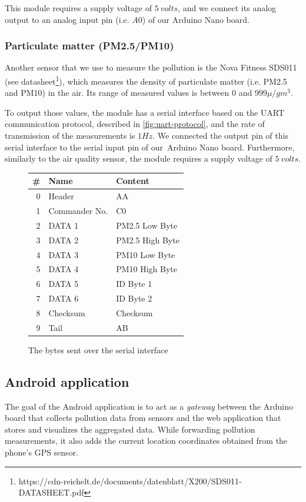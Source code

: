 \documentclass[12pt]{article}
\begin{document}
  This module requires a supply voltage of $5\ volts$, and we connect its analog output to an analog input pin (i.e. $A0$) of our Arduino Nano board.

  \subsubsection{Particulate matter (PM2.5/PM10)}
  Another sensor that we use to measure the pollution is the Nova Fitness SDS011 (see datasheet\footnote{https://cdn-reichelt.de/documents/datenblatt/X200/SDS011-DATASHEET.pdf}), which measures the density of particulate matter (i.e. PM2.5 and PM10) in the air. Its range of measured values is between $0$ and $999\mu/gm^3$.

  To output those values, the module has a serial interface based on the UART communication protocol, described in \autoref{fig:uart-protocol}, and the rate of transmission of the measurements is $1Hz$. We connected the output pin of this serial interface to the serial input pin of our Arduino Nano board. Furthermore, similarly to the air quality sensor, the module requires a supply voltage of $5\ volts$.


  \begin{figure}[ht]
    \centering
    \begin{tabular}{r | l | l}
      \# & Name & Content\\\toprule
      0 & Header & AA\\
      1 & Commander No. & C0\\
      2 & DATA 1 & PM2.5 Low Byte\\
      3 & DATA 2 & PM2.5 High Byte\\
      4 & DATA 3 & PM10 Low Byte\\
      5 & DATA 4 & PM10 High Byte\\
      6 & DATA 5 & ID Byte 1\\
      7 & DATA 6 & ID Byte 2\\
      8 & Checksum & Checksum\\
      9 & Tail & AB\\
    \end{tabular}
    \caption{The bytes sent over the serial interface}
    \label{fig:uart-protocol}
  \end{figure}
  \subsection{Android application}
  The goal of the Android application is to act as a \textit{gateway} between the Arduino board that collects pollution data from sensors and the web application that stores and visualizes the aggregated data. While forwarding pollution measurements, it also adds the current location coordinates obtained from the phone's GPS sensor.
\end{document}
